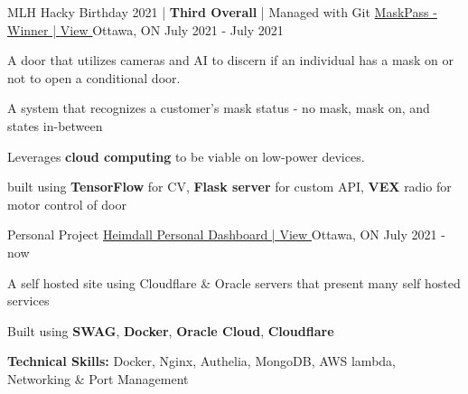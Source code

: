 \begin{cventries}
  \cventry
    {MLH Hacky Birthday 2021 | \textbf{Third Overall} | Managed with Git} %
    {\underline{MaskPass - Winner | \href{https://devpost.com/software/mlh-birthday-ads}{View \ExternalLink}}} %
    {Ottawa, ON} %
    {July 2021 - July 2021} %
    {
      \begin{cvitems} %
        \item {A door that utilizes cameras and AI to discern if an individual has a mask on or not to open a conditional door.}
        \item {A system that recognizes a customer’s mask status - no mask, mask on, and states in-between}
        \item {Leverages \textbf{cloud computing} to be viable on low-power devices.}
        \item {built using \textbf{TensorFlow} for CV, \textbf{Flask server} for custom API, \textbf{VEX} radio for motor control of door}
      \end{cvitems}
    }

  \cventry
    {Personal Project} %
    {\underline{Heimdall Personal Dashboard | \href{https://heimdall.lefan.me}{View \ExternalLink}}} %
    {Ottawa, ON} %
    {July 2021 - now} %
    {
      \begin{cvitems} %
        \item {A self hosted site using Cloudflare \& Oracle servers that present many self hosted services}
        \item {Built using \textbf{SWAG}, \textbf{Docker}, \textbf{Oracle Cloud}, \textbf{Cloudflare}}
        \item {\textbf{Technical Skills:} Docker, Nginx, Authelia, MongoDB, AWS lambda, Networking \& Port Management}
      \end{cvitems}
    }

\end{cventries}

